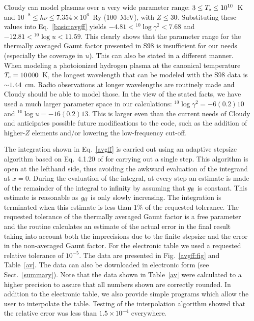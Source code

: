 \documentclass[useAMS,usenatbib]{mn2e}
\begin{document}
Cloudy can model plasmas over a very wide parameter range: $3 \leq T_{\rm e}
\leq 10^{10}$~K and $10^{-8} \leq h\nu \leq 7.354\times10^6$~Ry (100~MeV),
with $Z \leq 30$. Substituting these values into Eq.~\ref{basic:avgff} yields
$-4.81 < {}^{10}\log\gamma^2 < 7.68$ and $-12.81 < {}^{10}\log u < 11.59$.
This clearly shows that the parameter range for the thermally averaged Gaunt
factor presented in S98 is insufficient for our needs (especially the coverage
in $u$). This can also be stated in a different manner. When modeling a
photoionized hydrogen plasma at the canonical temperature $T_{\rm e} =
10\,000$~K, the longest wavelength that can be modeled with the S98 data is
$\sim 1.44$~cm. Radio observations at longer wavelengths are routinely made
and Cloudy should be able to model those. In the view of the stated facts, we
have used a much larger parameter space in our calculations:
${}^{10}\log\gamma^2 = -6(0.2)10$ and ${}^{10}\log u = -16(0.2)13$. This is
larger even than the current needs of Cloudy and anticipates possible future
modifications to the code, such as the addition of higher-$Z$ elements and/or
lowering the low-frequency cut-off.

The integration shown in Eq.~\ref{avgff} is carried out using an adaptive
stepsize algorithm based on Eq.~4.1.20 of \citet{NRC2} for carrying out a
single step. This algorithm is open at the lefthand side, thus avoiding the
awkward evaluation of the integrand at $x=0$. During the evaluation of the
integral, at every step an estimate is made of the remainder of the integral
to infinity by assuming that $g_{\rm ff}$ is constant. This estimate is
reasonable as $g_{\rm ff}$ is only slowly increasing. The integration is
terminated when this estimate is less than 1\% of the requested tolerance. The
requested tolerance of the thermally averaged Gaunt factor is a free parameter
and the routine calculates an estimate of the actual error in the final result
taking into account both the imprecisions due to the finite stepsize and the
error in the non-averaged Gaunt factor. For the electronic table we used a
requested relative tolerance of $10^{-5}$. The data are presented in
Fig.~\ref{avgff:fig} and Table~\ref{av}. The data can also be downloaded in
electronic form (see Sect.~\ref{summary}). Note that the data shown in
Table~\ref{av} were calculated to a higher precision to assure that all
numbers shown are correctly rounded. In addition to the electronic table, we
also provide simple programs which allow the user to interpolate the table.
Testing of the interpolation algorithm showed that the relative error was less
than $1.5\times10^{-4}$ everywhere.
\end{document}
